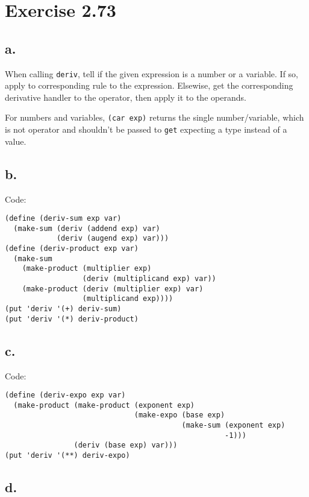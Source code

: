 \documentclass[../main.tex]{subfiles}
\begin{document}
\section{Exercise 2.73}

\subsection{a.}

When calling \lstinline{deriv}, tell if the given
 expression is a number or a variable. If so, apply
 to corresponding rule to the expression. Elsewise,
 get the corresponding derivative handler to the
 operator, then apply it to the operands.

For numbers and variables, \lstinline{(car exp)} returns
 the single number/variable, which is not operator and
 shouldn't be passed to \lstinline{get}  expecting
 a type instead of a value.

\subsection{b.}

Code:

\begin{lstlisting}
(define (deriv-sum exp var)
  (make-sum (deriv (addend exp) var)
            (deriv (augend exp) var)))
(define (deriv-product exp var)
  (make-sum
    (make-product (multiplier exp)
                  (deriv (multiplicand exp) var))
    (make-product (deriv (multiplier exp) var)
                  (multiplicand exp))))
(put 'deriv '(+) deriv-sum)
(put 'deriv '(*) deriv-product)
\end{lstlisting}

\subsection{c.}

Code:

\begin{lstlisting}
(define (deriv-expo exp var)
  (make-product (make-product (exponent exp)
                              (make-expo (base exp)
                                         (make-sum (exponent exp)
                                                   -1)))
                (deriv (base exp) var)))
(put 'deriv '(**) deriv-expo)
\end{lstlisting}

\subsection{d.}
\end{document}
